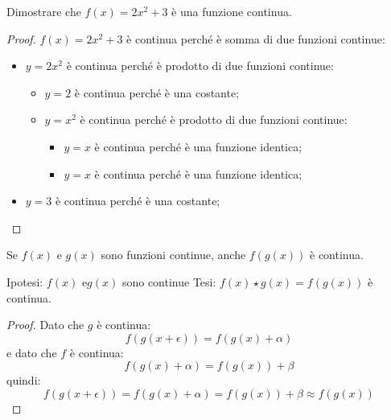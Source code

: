 \begin{esempio}
 Dimostrare che \(f(x)=2x^2 + 3\) è una funzione continua.

\begin{proof}

\(f(x)=2x^2 + 3\) è continua perché è somma di due funzioni continue: 
 \begin{itemize}[nosep]
  \item \(y=2x^2\) è continua perché è prodotto di due funzioni continue:
  \begin{itemize}[nosep]
   \item \(y=2\) è continua perché è una costante;
   \item \(y=x^2\) è continua perché è prodotto di due funzioni continue:
   \begin{itemize}[nosep]
    \item \(y=x\) è continua perché è una funzione identica;
    \item \(y=x\) è continua perché è una funzione identica;
   \end{itemize}
  \end{itemize}
  \item \(y=3\) è continua perché è una costante;
 \end{itemize}
\end{proof}

\end{esempio}

\begin{teorema}
Se \(f(x)\) e \(g(x)\) sono funzioni continue, anche \(f(g(x))\) è continua.
\end{teorema}

\noindent Ipotesi: 
\(f(x) \text{ e} g(x)\) sono continue
\tab Tesi: 
\(f(x) \star g(x) = f(g(x))\) è continua.

\begin{proof}
Dato che \(g\) è continua: 
\[f(g(x+\epsilon)) = f(g(x)+\alpha)\]
e dato che \(f\) è continua: 
\[f(g(x)+\alpha)=f(g(x))+\beta\]
quindi: 
\[f(g(x+\epsilon)) = f(g(x)+\alpha) = f(g(x))+\beta \approx f(g(x))\]
\end{proof}











